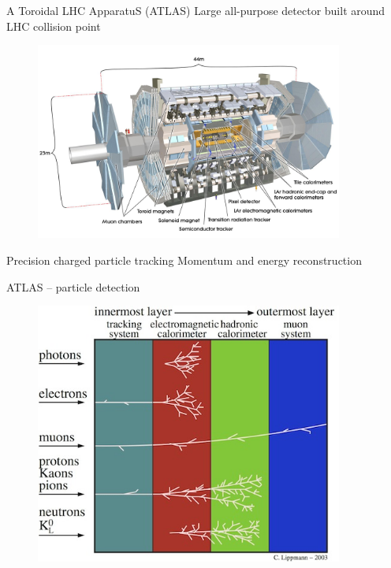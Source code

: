 \documentclass[10pt]{beamer}
\begin{document}
\begin{frame}{A Toroidal LHC ApparatuS (ATLAS)}
\centering
{\large\color{blue} Large all-purpose detector built around LHC collision point}
\begin{figure}
\centering
   \includegraphics[width=0.9\textwidth]{figures/figures_AtlasDetectorLabelled.png}
\end{figure}
\vspace*{-\baselineskip}
\begin{outline}
\1 Precision charged particle tracking
\1 Momentum and energy reconstruction
\end{outline}
\end{frame}

\begin{frame}{ATLAS -- particle detection}
\begin{figure}
\centering
   \includegraphics[width=0.9\textwidth]{figures/CL_fig1.jpg}
\end{figure}
\end{frame}
\end{document}
